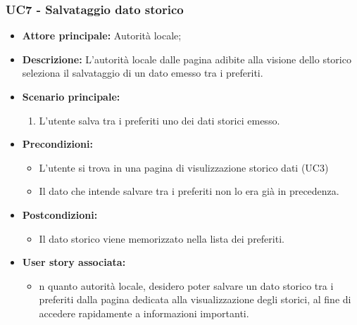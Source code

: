 \documentclass{article}
\begin{document}
\subsubsection{UC7 - Salvataggio dato storico}
\begin{itemize}
    \item \textbf{Attore principale:} Autorità locale;
    \item \textbf{Descrizione:} L’autorità locale dalle pagina adibite alla visione dello storico seleziona il salvataggio di un dato emesso tra i preferiti.
    \item \textbf{Scenario principale:}
          \begin{enumerate}
              \item L'utente salva tra i preferiti uno dei dati storici emesso.
          \end{enumerate}
    \item \textbf{Precondizioni:}
          \begin{itemize}
              \item  L'utente si trova in una pagina di visulizzazione storico dati (UC3)
              \item  Il dato che intende salvare tra i preferiti non lo era già in precedenza.
          \end{itemize}
    \item \textbf{Postcondizioni:}
          \begin{itemize}
              \item  Il dato storico viene memorizzato nella lista dei preferiti.
          \end{itemize}
    \item \textbf{User story associata:}
          \begin{itemize}
              \item n quanto autorità locale, desidero poter salvare un dato storico tra i preferiti dalla pagina dedicata alla visualizzazione degli storici, al fine di accedere rapidamente a informazioni importanti.
          \end{itemize}
\end{itemize}
\end{document}
